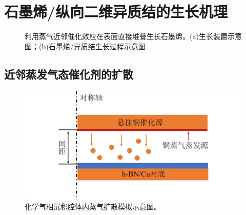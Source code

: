 \section{石墨烯/纵向二维异质结的生长机理}
    \label{cap:CG}
    \begin{figure}[htb]
        \newline
        \caption{利用蒸气近邻催化效应在表面直接堆叠生长石墨烯。(a)生长装置示意图；(b)石墨烯/异质结生长过程示意图}
        \label{fig:CG_diagram_CVD}
    \end{figure}

    \subsection{近邻蒸发气态催化剂的扩散}
    
    \begin{figure}[htb]
        \includegraphics{pic/CG_diagram_FEM_structure.png}
        \caption{化学气相沉积腔体内蒸气扩散模拟示意图。}
        \label{fig:CG_diagram_FEM_structure}
    \end{figure}

